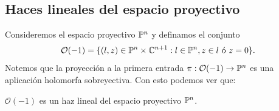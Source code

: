 \subsection{Haces lineales del espacio proyectivo}

	Consideremos el espacio proyectivo $\mathbb{P}^n$ y definamos el conjunto
	\begin{equation*}
		\mathcal{O}(-1)=\{(l,z)\in\mathbb{P}^n\times \mathbb{C}^{n+1}:l\in\mathbb{P}^n, z\in l\text{ ó }z=0\}.
	\end{equation*}
	Notemos que la proyección a la primera entrada $\pi:\mathcal{O}(-1)\to\mathbb{P}^n$ es una aplicación holomorfa sobreyectiva. Con esto podemos ver que:
	
	\begin{propo}
		$\mathcal{O}(-1)$ es un haz lineal del espacio proyectivo $\mathbb{P}^n$.
	\end{propo}
